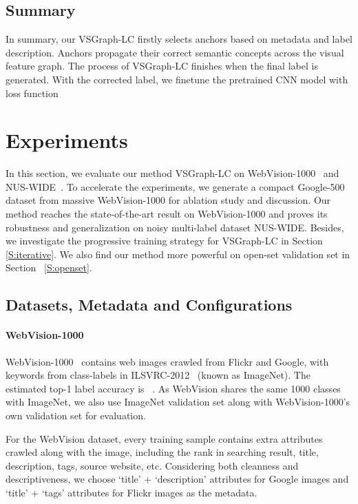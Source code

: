 \documentclass[sigconf]{acmart}
\begin{document}
    \subsection{Summary}
    In summary, our VSGraph-LC firstly selects anchors based on metadata and label description. Anchors propagate their correct semantic concepts across the visual feature graph. 
    The process of VSGraph-LC finishes when the final label  is generated. With the corrected label, we finetune the pretrained CNN model with loss function
    
	


	
\section{Experiments}
In this section, we evaluate our method VSGraph-LC on WebVision-1000~\cite{li2017webvision} and NUS-WIDE~\cite{nus-wide-civr09}. To accelerate the experiments, we generate a compact Google-500 dataset from massive WebVision-1000 for ablation study and discussion. Our method reaches the state-of-the-art result on WebVision-1000 and proves its robustness and generalization on noisy multi-label dataset NUS-WIDE. Besides, we investigate the progressive training strategy for VSGraph-LC in Section \ref{S:iterative}. We also find our method more powerful on open-set validation set in Section ~\ref{S:openset}.

\subsection{Datasets, Metadata and Configurations}
\label{S:Dataset}
\paragraph{WebVision-1000} WebVision-1000~\cite{li2017webvision} contains  web images crawled from Flickr and Google, with keywords from  class-labels in ILSVRC-2012~\cite{deng2009imagenet} (known as ImageNet).
The estimated top-1 label accuracy is ~\cite{guo2018curriculumnet}. 
As WebVision shares the same 1000 classes with ImageNet, we also use ImageNet validation set along with WebVision-1000's own validation set for evaluation.

For the WebVision dataset, every training sample contains extra attributes crawled along with the image, including the rank in searching result, title, description, tags, source website, etc. Considering both cleanness and descriptiveness, we choose `title' + `description' attributes for Google images and `title' + `tags' attributes for Flickr images as the metadata.
\end{document}
